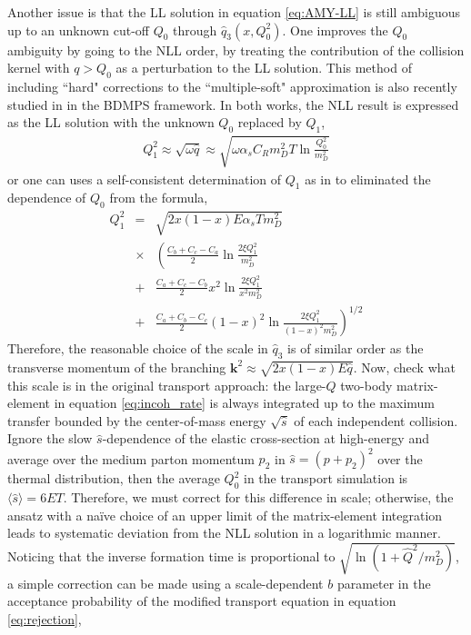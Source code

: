 \documentclass[aps, prc, reprint, amsmath, groupedaddress, nofootinbib]{revtex4-1}
\begin{document}
Another issue is that the LL solution in equation \ref{eq:AMY-LL} is still ambiguous up to an unknown cut-off $Q_0$ through $\hat{q}_3(x, Q_0^2)$.
One improves the $Q_0$ ambiguity by going to the NLL order, by treating the contribution of the collision kernel with $q>Q_0$ as a perturbation to the LL solution.
This method of including ``hard" corrections to the ``multiple-soft" approximation is also recently studied in \cite{Mehtar-Tani:2019tvy} in the BDMPS framework.
In both works, the NLL result is expressed as the LL solution with the unknown $Q_0$ replaced by $Q_1$,
\begin{eqnarray}
Q_1^2  \approx \sqrt{\omega \hat{q}} \approx \sqrt{\omega \alpha_s C_R m_D^2 T \ln\frac{Q_0^2}{m_D^2}}
\label{eq:Q1}
\end{eqnarray}
or one can uses a self-consistent determination of $Q_1$ as in \cite{Arnold:2008zu} to eliminated the dependence of $Q_0$ from the formula,
\begin{eqnarray}
Q_1^2 &=& \sqrt{2 x (1-x) E \alpha_s T m_D^2}\\\nonumber
&\times & \left(
\frac{C_b+C_c-C_a}{2}\ln\frac{2\xi Q_1^2}{m_D^2} \right.\\\nonumber 
&+& \frac{C_a+C_c-C_b}{2} x^2 \ln\frac{2\xi Q_1^2}{x^2 m_D^2} \\\nonumber 
&+& \left.\frac{C_a+C_b-C_c}{2} (1-x)^2 \ln\frac{2\xi Q_1^2}{(1-x)^2 m_D^2} \right)^{1/2}
\label{eq:Q1-sf}
\end{eqnarray}
Therefore, the reasonable choice of the scale in $\hat{q}_3$ is of similar order as the transverse momentum of the branching $\mathbf{k}^2 \approx \sqrt{2x(1-x)E \hat{q}}$.
Now, check what this scale is in the original transport approach: the large-$Q$ two-body matrix-element in equation \ref{eq:incoh_rate} is always integrated up to the maximum transfer bounded by the center-of-mass energy $\sqrt{\hat{s}}$ of each independent collision. 
Ignore the slow $\hat{s}$-dependence of the elastic cross-section at high-energy and average over the medium parton momentum $p_2$ in $\hat{s} = (p+p_2)^2$ over the thermal distribution, then the average $Q_{0}^2$ in the transport simulation is  $\langle\hat{s}\rangle = 6ET$.
Therefore, we must correct for this difference in scale; otherwise, the ansatz with a na\"ive choice of an upper limit of the matrix-element integration leads to systematic deviation from the NLL solution in a logarithmic manner.
Noticing that the inverse formation time is proportional to $\sqrt{\ln(1+\hat{Q}^2/m_D^2)}$, a simple correction can be made using a scale-dependent $b$ parameter in the acceptance probability of the modified transport equation in equation \ref{eq:rejection},
\end{document}
